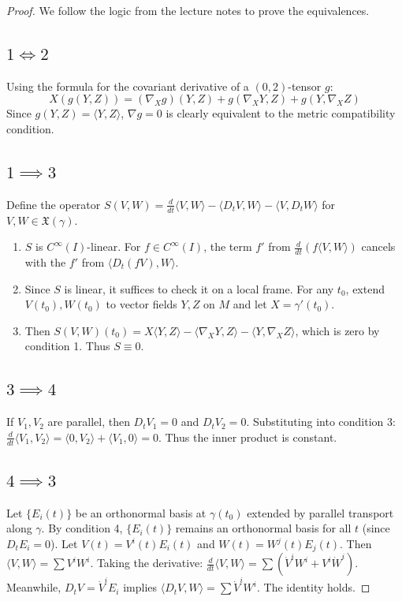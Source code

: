 \documentclass[11pt, a4paper]{article}
\theoremstyle{plain}
\theoremstyle{definition}
\theoremstyle{remark}
\begin{document}
\begin{proof}
We follow the logic from the lecture notes to prove the equivalences.

\subsection*{$1 \iff 2$}
Using the formula for the covariant derivative of a $(0,2)$-tensor $g$:
\[ X(g(Y, Z)) = (\nabla_X g)(Y, Z) + g(\nabla_X Y, Z) + g(Y, \nabla_X Z) \]
Since $g(Y, Z) = \langle Y, Z \rangle$, $\nabla g = 0$ is clearly equivalent to the metric compatibility condition.

\subsection*{$1 \implies 3$}
Define the operator $S(V, W) = \frac{d}{dt}\langle V, W \rangle - \langle D_t V, W \rangle - \langle V, D_t W \rangle$ for $V, W \in \mathfrak{X}(\gamma)$.
\begin{enumerate}
    \item $S$ is $C^\infty(I)$-linear. For $f \in C^\infty(I)$, the term $f'$ from $\frac{d}{dt}(f\langle V, W \rangle)$ cancels with the $f'$ from $\langle D_t(fV), W \rangle$.
    \item Since $S$ is linear, it suffices to check it on a local frame. For any $t_0$, extend $V(t_0), W(t_0)$ to vector fields $Y, Z$ on $M$ and let $X = \gamma'(t_0)$.
    \item Then $S(V, W)(t_0) = X\langle Y, Z \rangle - \langle \nabla_X Y, Z \rangle - \langle Y, \nabla_X Z \rangle$, which is zero by condition 1. Thus $S \equiv 0$.
\end{enumerate}

\subsection*{$3 \implies 4$}
If $V_1, V_2$ are parallel, then $D_t V_1 = 0$ and $D_t V_2 = 0$. 
Substituting into condition 3: $\frac{d}{dt}\langle V_1, V_2 \rangle = \langle 0, V_2 \rangle + \langle V_1, 0 \rangle = 0$. Thus the inner product is constant.

\subsection*{$4 \implies 3$}
Let $\{E_i(t)\}$ be an orthonormal basis at $\gamma(t_0)$ extended by parallel transport along $\gamma$. By condition 4, $\{E_i(t)\}$ remains an orthonormal basis for all $t$ (since $D_t E_i = 0$).
Let $V(t) = V^i(t) E_i(t)$ and $W(t) = W^j(t) E_j(t)$. Then $\langle V, W \rangle = \sum V^i W^i$.
Taking the derivative: $\frac{d}{dt}\langle V, W \rangle = \sum (\dot{V}^i W^i + V^i \dot{W}^i)$.
Meanwhile, $D_t V = \dot{V}^i E_i$ implies $\langle D_t V, W \rangle = \sum \dot{V}^i W^i$. The identity holds.


\end{proof}
\end{document}
